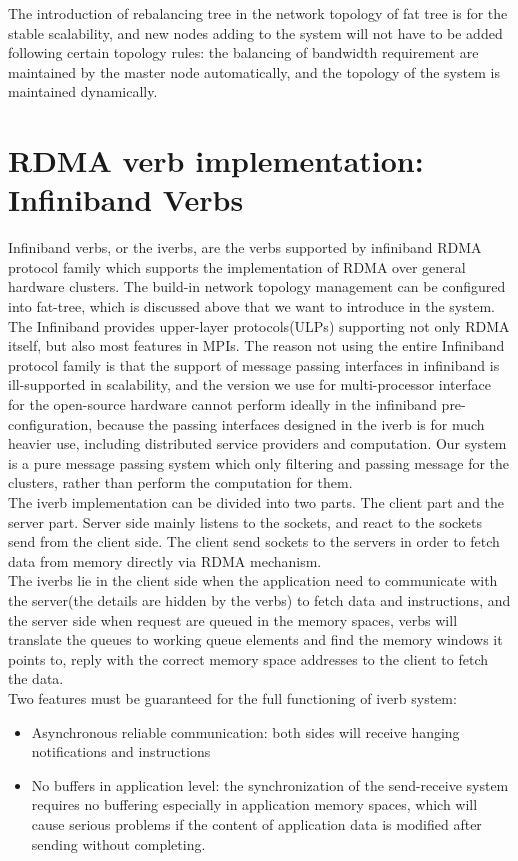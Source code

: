 \documentclass[11pt,openright,a4paper]{report}
\begin{document}
The introduction of rebalancing tree in the network topology of fat tree is for the stable scalability, and new nodes adding to the system will not have to be added following certain topology rules: the balancing of bandwidth requirement are maintained by the master node automatically, and the topology of the system is maintained dynamically.\\
\section{RDMA verb implementation: Infiniband Verbs}
Infiniband verbs, or the iverbs, are the verbs supported by infiniband RDMA protocol family which supports the implementation of RDMA over general hardware clusters. The build-in network topology management can be configured into fat-tree, which is discussed above that we want to introduce in the system. \\
The Infiniband provides upper-layer protocols(ULPs) supporting not only RDMA itself, but also most features in MPIs. The reason not using the entire Infiniband protocol family is that the support of message passing interfaces in infiniband is ill-supported in scalability, and the version we use for multi-processor interface for the open-source hardware cannot perform ideally in the infiniband pre-configuration, because the passing interfaces designed in the iverb is for much heavier use, including distributed service providers and computation. Our system is a pure message passing system which only filtering and passing message for the clusters, rather than perform the computation for them.\\
The iverb implementation can be divided into two parts\cite{bedeir2010building}. The client part and the server part. Server side mainly listens to the sockets, and react to the sockets send from the client side. The client send sockets to the servers in order to fetch data from memory directly via RDMA mechanism.\\ 
The iverbs lie in the client side when the application need to communicate with the server(the details are hidden by the verbs) to fetch data and instructions, and the server side when request are queued in the memory spaces, verbs will translate the queues to working queue elements and find the memory windows it points to, reply with the correct memory space addresses to the client to fetch the data.\\
Two features must be guaranteed for the full functioning of iverb system:
\begin{itemize}
	\item Asynchronous reliable communication: both sides will receive hanging notifications and instructions 
    \item No buffers in application level: the synchronization of the send-receive system requires no buffering especially in application memory spaces, which will cause serious problems if the content of application data is modified after sending without completing.
\end{itemize}
\end{document}
